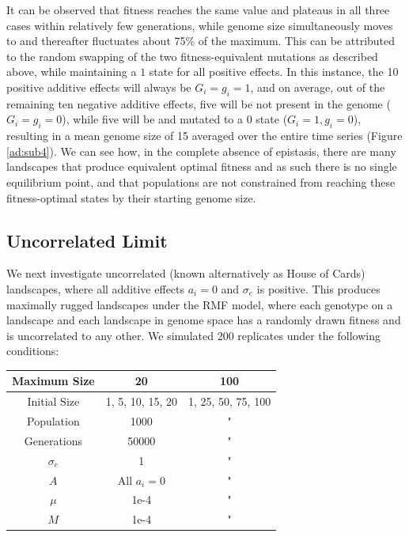 \documentclass[paper=a4, fontsize=11pt,twoside]{scrartcl}       %
\begin{document}
It can be observed that fitness reaches the same value and plateaus in all three cases within relatively few generations, while genome size simultaneously moves to and thereafter fluctuates about 75\% of the maximum. This can be attributed to the random swapping of the two fitness-equivalent mutations as described above, while maintaining a $1$ state for all positive effects. In this instance, the 10 positive additive effects will always be $G_i = g_i = 1$, and on average, out of the remaining ten negative additive effects, five will be not present in the genome ($G_i = g_i = 0$), while five will be and mutated to a $0$ state ($G_i = 1, g_i = 0$), resulting in a mean genome size of 15 averaged over the entire time series (Figure \ref{ad:sub4}). We can see how, in the complete absence of epistasis, there are many landscapes that produce equivalent optimal fitness and as such there is no single equilibrium point, and that populations are not constrained from reaching these fitness-optimal states by their starting genome size. 

\subsection*{Uncorrelated Limit}

We next investigate uncorrelated (known alternatively as House of Cards) landscapes, where all additive effects $a_i = 0$ and $\sigma_e$ is positive. This produces maximally rugged landscapes under the RMF model, where each genotype on a landscape and each landscape in genome space has a randomly drawn fitness and is uncorrelated to any other. We simulated 200 replicates under the following conditions:

\begin{center}
    \begin{tabular}{ | c | c | c | }
        \hline
	Maximum Size & 20 & 100 \\ \hline
	Initial Size & 1, 5, 10, 15, 20 & 1, 25, 50, 75, 100 \\ \hline
	Population & 1000 & " \\ \hline
	Generations & 50000 & " \\ \hline
	$\sigma_e$ & 1 & " \\ \hline
	$A$ & All $a_i = 0$ & " \\ \hline
	$\mu$  & 1e-4 & " \\ \hline
	$M$ & 1e-4 & " \\ \hline
    \end{tabular}
\end{center}
\end{document}
